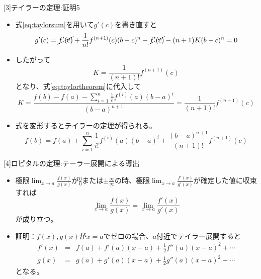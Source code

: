 \begin{slide}{[3]テイラーの定理:証明5}
\begin{itemize}
\item 式\ref{eq:taylorsum}を用いて$g'(c)$を書き直すと
\begin{equation}
g'(c) = \cancel{f'(c)} + \frac{1}{n!}f^{(n+1)}(c)(b-c)^n - \cancel{f'(c)} - (n+1)K(b-c)^{n} = 0 \nonumber 
\end{equation}
\item したがって
\begin{equation}
K = \frac{1}{(n+1)!}f^{(n+1)}(c) \nonumber 
\end{equation}
となり、式\ref{eq:taylortheorem}に代入して
\begin{equation}
K = \frac{f(b) - f(a) - \sum_{i=1}^n \frac{1}{i!}f^{(i)}(a)(b-a)^i }{(b-a)^{n+1}}  = \frac{1}{(n+1)!}f^{(n+1)}(c) \nonumber
\end{equation}
\item 式を変形するとテイラーの定理が得られる。
\begin{equation}
f(b) = f(a) + \sum_{i=1}^n \frac{1}{i!}f^{(i)}(a)(b-a)^i  + \frac{(b-a)^{n+1}}{(n+1)!}f^{(n+1)}(c) \nonumber
\end{equation}
\end{itemize}
\end{slide}
\begin{slide}{[4]ロピタルの定理:テーラー展開による導出}
\begin{itemize}
\item 極限$\lim_{x \to a}\frac{f(x)}{g(x)}$が$\frac{0}{0}$または$\pm\frac{\infty}{\infty}$の時、極限$\lim_{x\to a}\frac{f'(x)}{g'(x)}$が確定した値に収束すれば
\begin{equation}
\lim_{x\to a} \frac{f(x)}{g(x)} = \lim_{x\to a}\frac{f'(x)}{g'(x)}
\end{equation}
が成り立つ。
\item 証明：$f(x), g(x)$が$x=a$でゼロの場合、$a$付近でテイラー展開すると
\begin{eqnarray}
f'(x) &=& f(a) + f'(a) (x-a) + \frac{1}{2}f''(a)(x-a)^2 + \cdots \nonumber \\
g(x) &=& g(a) + g'(a)(x-a) +  \frac{1}{2}g''(a)(x-a)^2 + \cdots \nonumber
\end{eqnarray}
となる。
\end{itemize}
\end{slide}










